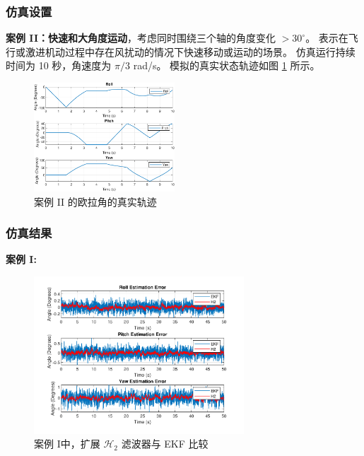 \documentclass{beamer}
\begin{document}
	\begin{frame}
	\frametitle{仿真设置}
	\textbf{案例 II：快速和大角度运动}，考虑同时围绕三个轴的角度变化 $> 30^{\circ}$。 表示在飞行或激进机动过程中存在风扰动的情况下快速移动或运动的场景。 仿真运行持续时间为 10 秒，角速度为 $\pi/3$ rad/s。 模拟的真实状态轨迹如图 \ref{Tra_high} 所示。
	\begin{figure}[h!]
		\centering
		\includegraphics[width=0.47\textwidth]{highangle1.pdf}
		\caption{案例 II 的欧拉角的真实轨迹}
		\label{Tra_high}
	\end{figure}
\end{frame}

	\begin{frame}
		\frametitle{仿真结果}
		\textbf{案例 I:} 
		\begin{figure}[h]
			\centering
			\includegraphics[width=0.7\textwidth]{EH2_lowangle.pdf}
			\caption{案例 I中，扩展 $\mathcal{H}_2$ 滤波器与 EKF 比较}
			\label{comp_low}
		\end{figure}
	\end{frame}
\end{document}
